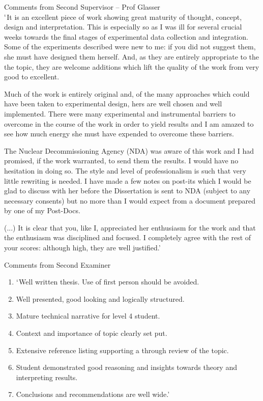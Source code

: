 \documentclass[14pt,twoside]{report}
\begin{document}
\medskip
\noindent
{\Large Comments from Second Supervisor -- Prof Glasser}\\
\noindent
$\lq$It is an excellent piece of work showing great maturity of thought, concept, design and interpretation. This is especially so as I was ill for several crucial weeks towards the final stages of experimental data collection and integration. Some of the experiments described were new to me: if you did not suggest them, she must have designed them herself. And, as they are entirely appropriate to the  the topic, they are welcome additions which lift the quality of the work from very good to excellent. 

\noindent
Much of the work is entirely original and, of the many approaches which could have been taken to experimental design, hers are well chosen and well implemented. There were many experimental and instrumental barriers to overcome in the course of the work in order to yield results and I am amazed to see how much energy she must have expended to overcome these barriers.

\noindent
The Nuclear Decommissioning Agency (NDA) was aware of this work and I had promised, if the work warranted,  to send them the results. I would have no hesitation in doing so. The style and level of professionalism is such that very little rewriting is needed. I have made a few notes on post-its  which I would be glad to discuss with her before the Dissertation is sent to NDA (subject to any necessary consents) but no more than I would expect from a document prepared by one of my Post-Docs.  

\noindent
(...) It is clear that you, like I, appreciated her enthusiasm for the work and that the enthusiasm was disciplined and focused. I completely agree with the rest of your scores: although high, they are well justified.'

\medskip
\noindent
{\Large Comments from Second Examiner}
\begin{enumerate}
\item $\lq$Well written thesis. Use of first person should be avoided. 
\item Well presented, good  looking and logically structured. 
\item Mature technical narrative for level 4 student. 
\item Context and importance of topic clearly set put.
\item Extensive reference listing supporting a through review of the topic.
\item Student demonstrated good reasoning and insights towards theory and interpreting results.
\item Conclusions and recommendations are well wide.'
\end{enumerate}
\end{document}
